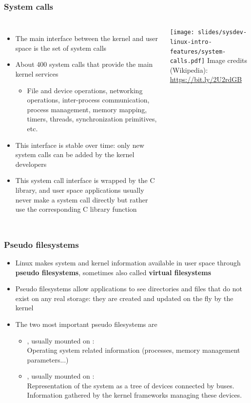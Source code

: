\begin{frame}
  \frametitle{System calls}
  \begin{columns}
    \begin{itemize}
    \item The main interface between the kernel and user space is the set
      of system calls
    \item About 400 system calls that provide the main kernel services
      \begin{itemize}
      \item File and device operations, networking operations,
        inter-process communication, process management, memory mapping,
        timers, threads, synchronization primitives, etc.
      \end{itemize}
    \item This interface is stable over time: only new system calls can
      be added by the kernel developers
    \item This system call interface is wrapped by the C library, and
      user space applications usually never make a system call directly
      but rather use the corresponding C library function
    \end{itemize}
      \texttt{[image: slides/sysdev-linux-intro-features/system-calls.pdf]}
      \scriptsize
      Image credits (Wikipedia):\\
      \url{https://bit.ly/2U2rdGB}
    \end{columns}
\end{frame}

\begin{frame}
  \frametitle{Pseudo filesystems}
  \begin{itemize}
  \item Linux makes system and kernel information available in user
    space through {\bf pseudo filesystems}, sometimes also called {\bf
      virtual filesystems}
  \item Pseudo filesystems allow applications to see directories and
    files that do not exist on any real storage: they are created and
    updated on the fly by the kernel
  \item The two most important pseudo filesystems are
    \begin{itemize}
    \item {}, usually mounted on : \\
      Operating system related information (processes, memory
      management parameters...)
    \item {}, usually mounted on : \\
       Representation of the system as a tree of
       devices connected by buses. Information
       gathered by the kernel frameworks managing these devices.
    \end{itemize}
  \end{itemize}
\end{frame}

